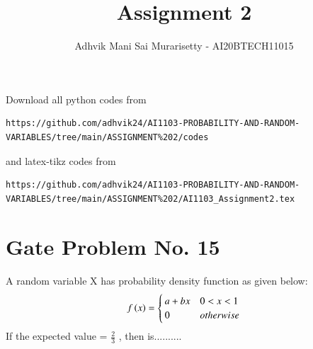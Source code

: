 \documentclass[journal,12pt,twocolumn]{IEEEtran}
\begin{document}
\vspace{3cm}
\title{Assignment 2}
\author{Adhvik Mani Sai Murarisetty - AI20BTECH11015}
\maketitle
\newpage
\bigskip
\renewcommand{\thefigure}{\theenumi}
\renewcommand{\thetable}{\theenumi}
Download all python codes from 
\begin{lstlisting}
https://github.com/adhvik24/AI1103-PROBABILITY-AND-RANDOM-VARIABLES/tree/main/ASSIGNMENT%202/codes
\end{lstlisting}
%
and latex-tikz codes from 
%
\begin{lstlisting}
https://github.com/adhvik24/AI1103-PROBABILITY-AND-RANDOM-VARIABLES/tree/main/ASSIGNMENT%202/AI1103_Assignment2.tex
\end{lstlisting}
\section{Gate Problem No. 15}
A random variable X has probability density
function  as given below:
\begin{align}
f\left(x\right)
= 
\begin{cases}
a+bx & 0<x<1
\\
0 & otherwise
\end{cases}\label{a}
\end{align}
If the expected value  = $\frac{2}{3}$
, then  is..........
\end{document}
